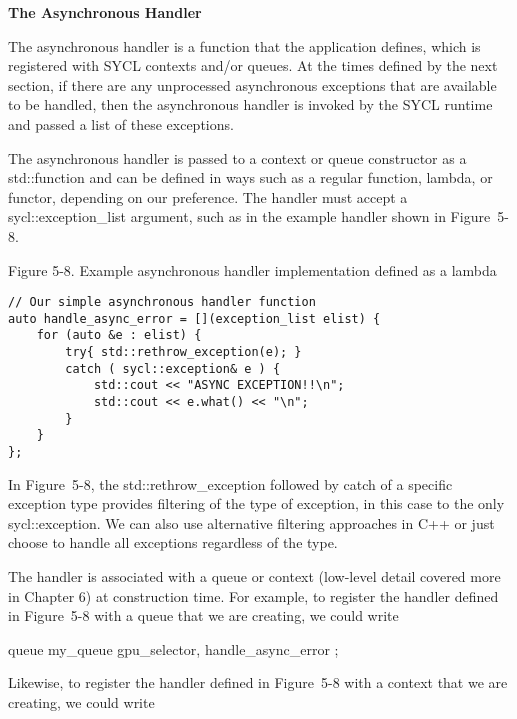 \hspace*{\fill} \par %
\textbf{The Asynchronous Handler}

The asynchronous handler is a function that the application defines, which is registered with SYCL contexts and/or queues. At the times defined by the next section, if there are any unprocessed asynchronous exceptions that are available to be handled, then the asynchronous handler is invoked by the SYCL runtime and passed a list of these exceptions.\par

The asynchronous handler is passed to a context or queue constructor as a std::function and can be defined in ways such as a regular function, lambda, or functor, depending on our preference. The handler must accept a sycl::exception\_list argument, such as in the example handler shown in Figure 5-8.\par

\hspace*{\fill} \par %
Figure 5-8. Example asynchronous handler implementation defined as a lambda
\begin{lstlisting}[caption={}]
// Our simple asynchronous handler function
auto handle_async_error = [](exception_list elist) {
	for (auto &e : elist) {
		try{ std::rethrow_exception(e); }
		catch ( sycl::exception& e ) {
			std::cout << "ASYNC EXCEPTION!!\n";
			std::cout << e.what() << "\n";
		}
	}
};
\end{lstlisting}

In Figure 5-8, the std::rethrow\_exception followed by catch of a specific exception type provides filtering of the type of exception, in this case to the only sycl::exception. We can also use alternative filtering approaches in C++ or just choose to handle all exceptions regardless of the type.\par

The handler is associated with a queue or context (low-level detail covered more in Chapter 6) at construction time. For example, to register the handler defined in Figure 5-8 with a queue that we are creating, we could write\par

queue my\_queue{ gpu\_selector{}, handle\_async\_error };\par

Likewise, to register the handler defined in Figure 5-8 with a context that we are creating, we could write\par

